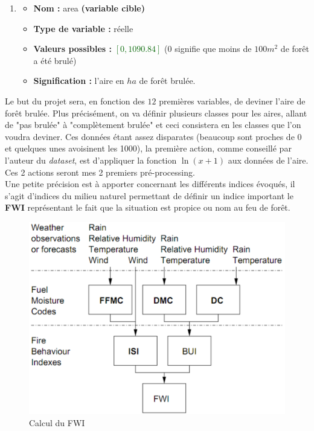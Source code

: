 \documentclass{article}
\newcommand{\titre}[1]{\textcolor{title}{#1}}
\newcommand{\gre}[1]{\textcolor{darkgreen}{#1}}
\begin{document}
\begin{sffamily}
\begin{enumerate}
\begin{itemize}
\end{itemize}
\item \begin{itemize}
	\item \textbf{Nom : }\titre{area} \textbf{(variable cible)}
	\item \textbf{Type de variable : }réelle
	\item \textbf{Valeurs possibles : }\gre{$[0,1090.84]$} (0 signifie que moins de $100m^2$ de forêt a été brulé)
	\item \textbf{Signification : }l'aire en $ha$ de forêt brulée.
\end{itemize}
\end{enumerate}

Le but du projet sera, en fonction des $12$ premières variables, de deviner l'aire de forêt brulée. Plus précisément, on va 
définir plusieurs classes pour les aires, allant de "pas brulée" à "complètement brulée" et ceci consistera en les classes que 
l'on voudra deviner. Ces données étant assez disparates (beaucoup sont proches de 0 et quelques unes avoisinent les 1000), la 
première action, comme conseillé par l'auteur du \textit{dataset}, est d'appliquer la fonction $\ln{(x+1)}$ aux données de 
l'aire. Ces 2 actions seront mes 2 premiers pré-processing. \\

Une petite précision est à apporter concernant les différents indices évoqués, il s'agit d'indices du milieu naturel permettant 
de définir un indice important le \textbf{FWI} représentant le fait que la situation est propice ou nom au feu de forêt.

\begin{figure}[h!]
    \begin{center}
    \includegraphics[scale=0.4]{FWI.pdf}
    \caption{Calcul du FWI}
    \label{park}
    \end{center}
\end{figure}


\end{sffamily}
\end{document}
